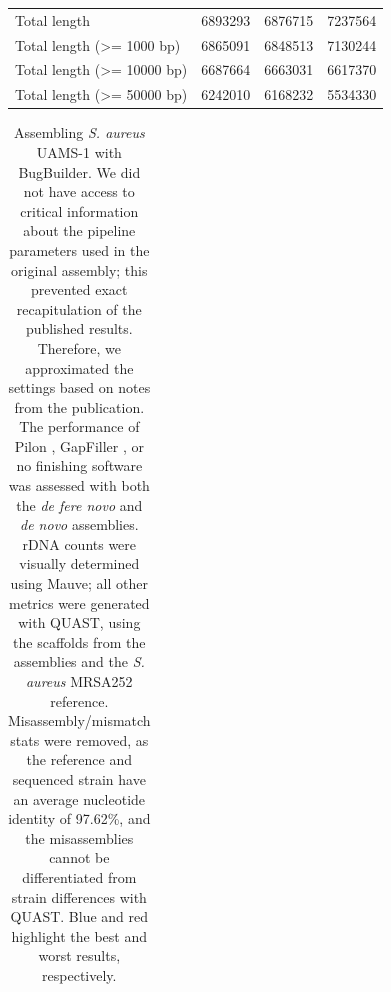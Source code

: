 \documentclass[10pt]{article}
\begin{document}
\begin{table}[]
\begin{tabular}{lrrr}
Total length & 6893293 & \cellcolor[HTML]{FBDADA}6876715 & \cellcolor[HTML]{CDCDF9}7237564 \\
Total length (\textgreater= 1000 bp) & 6865091 & \cellcolor[HTML]{FBDADA}6848513 & \cellcolor[HTML]{CDCDF9}7130244 \\
Total length (\textgreater= 10000 bp) & \cellcolor[HTML]{CDCDF9}6687664 & 6663031 & \cellcolor[HTML]{FBDADA}6617370 \\
Total length (\textgreater= 50000 bp) & \cellcolor[HTML]{CDCDF9}6242010 & 6168232 & \cellcolor[HTML]{FBDADA}5534330
\end{tabular}
\end{table}


\begin{table}[ht]
\begin{center}
  \caption{Assembling \textit{S. aureus} UAMS-1 with BugBuilder. We did not have access to critical information about the pipeline parameters used in the original assembly; this prevented exact recapitulation of the published results. Therefore, we approximated the settings based on notes from the publication. The performance of Pilon \cite{Walker2014a}, GapFiller \cite{Boetzer2012}, or no finishing software was assessed with both the \textit{de fere novo} and \textit{de novo} assemblies. rDNA counts were visually determined using Mauve; all other metrics were generated with QUAST, using the scaffolds from the assemblies and the \textit{S. aureus} MRSA252 reference. Misassembly/mismatch stats were removed, as the reference and sequenced strain have an average nucleotide identity of 97.62\%, and the misassemblies cannot be differentiated from strain differences with QUAST. Blue and red highlight the best and worst results, respectively.}
\begin{tabular}{lrrr|rrr}


\end{tabular}
\end{center}
\end{table}
\end{document}
